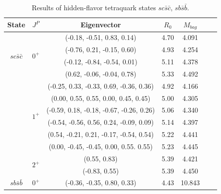 \documentclass[prd,twocolumn,floatfix,nofootinbib]{revtex4}
\begin{document}
\renewcommand{\tabcolsep}{0.84cm}
\renewcommand{\arraystretch}{1.2}
\begin{table}[!htbp]
    \caption{Results of hidden-flavor tetraquark states $sc\bar{s}\bar{c}$, $sb\bar{s}\bar{b}$.}
    \label{tab:hiddenflavor-sQsQ}
    \begin{tabular}{ccccccc}
        \hline\hline
        {\rm State}     &$J^{P}$    &{\rm Eigenvector}                          &$R_{0}$    &$M_{bag}$ \\ \hline
        \multirow{4}{*}{$sc\bar{s}\bar{c}$}
                        &\multirow{4}{*}{$0^{+}$}
                                    &(-0.18, -0.51, 0.83, 0.14)                 &4.70	    &4.091 \\ 
                        &           &(-0.76, 0.21, -0.15, 0.60)                 &4.93	    &4.254 \\ 
                        &           &(-0.12, -0.84, -0.54, 0.01)                &5.11	    &4.378 \\ 
                        &           &(0.62, -0.06, -0.04, 0.78)                 &5.33	    &4.492 \\                    
                        &\multirow{6}{*}{$1^{+}$}
                                    &(-0.25, 0.33, -0.33, 0.69, -0.36, 0.36)    &4.92	    &4.166 \\ 
                        &           &(0.00, 0.55, 0.55, 0.00, 0.45, 0.45)       &5.00	    &4.305 \\ 
                        &           &(-0.59, 0.18, -0.18, -0.67, -0.26, 0.26)   &5.06	    &4.340 \\ 
                        &           &(-0.54, -0.56, 0.56, 0.24, -0.09, 0.09)    &5.14	    &4.397 \\ 
                        &           &(0.54, -0.21, 0.21, -0.17, -0.54, 0.54)    &5.22	    &4.441 \\ 
                        &           &(0.00, -0.45, -0.45, 0.00, 0.55. 0.55)     &5.23	    &4.445 \\ 
                        &\multirow{2}{*}{$2^{+}$}
                                    &(0.55, 0.83)                               &5.39	    &4.421 \\ 
                        &           &(-0.83, 0.55)                              &5.39	    &4.450 \\ 
        \multirow{4}{*}{$sb\bar{s}\bar{b}$}
                        &\multirow{4}{*}{$0^{+}$}
                                    &(-0.36, -0.35, 0.80, 0.33)                 &4.43	    &10.843 \\ 

\end{tabular}
\end{table}
\end{document}
